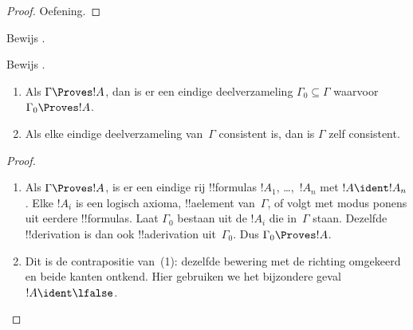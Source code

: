 \documentclass[openany]{memoir}
\begin{document}
\begin{proof}
Oefening.
\end{proof}

\begin{prob}
Bewijs .
\end{prob}
\tagendprob

\begin{prob}
Bewijs .
\end{prob}
\tagendprob

\begin{prop}
  \begin{enumerate}
  \item Als $\Gamma \Proves !A$, dan is er een eindige
    deelverzameling $\Gamma_0 \subseteq \Gamma$ waarvoor
    $\Gamma_0 \Proves !A$.
  \item Als elke eindige deelverzameling van~$\Gamma$ consistent is,
    dan is $\Gamma$ zelf consistent.
  \end{enumerate}
\end{prop}

\begin{proof}
  \begin{enumerate}
    \item Als $\Gamma \Proves !A$, is er een eindige rij
      !!{formula}s $!A_1$, \dots,~$!A_n$ met $!A \ident !A_n$. Elke
      $!A_i$ is een logisch axioma, !!a{element} van~$\Gamma$, of volgt
      met modus ponens uit eerdere !!{formula}s. Laat $\Gamma_0$
      bestaan uit de $!A_i$ die in~$\Gamma$ staan. Dezelfde
      !!{derivation} is dan ook !!a{derivation} uit~$\Gamma_0$. Dus
      $\Gamma_0 \Proves !A$.
    \item Dit is de contrapositie van~(1): dezelfde bewering met de
      richting omgekeerd en beide kanten ontkend. Hier gebruiken we
      het bijzondere geval $!A \ident \lfalse$.
\end{enumerate}
\end{proof}
\endgroup

\begingroup
\def\olfilename{OLP-0119}
\def\olfilepath{content/first-order-logic/axiomatic-deduction/}
\hypertarget{unit-OLP-0119}{}
\end{document}
